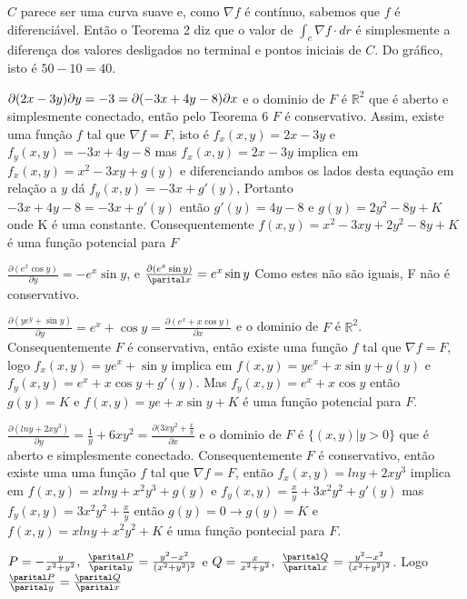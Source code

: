 \documentclass[11pt,a4paper]{article}
\begin{document}
\begin{enumerate}
{\item $C$ parece ser uma curva suave e, como $\nabla f$ é contínuo, sabemos que $f$ é diferenciável. Então o Teorema 2 diz que o valor
de $\int_c \nabla f · dr$ é simplesmente a diferença dos valores desligados no terminal e pontos iniciais de $ C$. Do gráfico, isto é
$50-10 = 40$.
\item $\partial(2x - 3y)\/ \partial y = -3 = \partial(-3x + 4y - 8)\/ \partial x$ e o dominio de $F$ é $\mathbb{R}^2$ que é aberto e simplesmente conectado, então pelo Teorema 6 $F$ é conservativo. Assim, existe uma função $f$ tal que $\nabla f =  F$, isto é $f_x (x,y) = 2x - 3y$ e $f_y (x,y) = -3x + 4y - 8$ mas $f_x (x,y) = 2x - 3y$ implica em $f_x (x,y) = x^2 - 3xy + g(y)$ e diferenciando ambos os lados desta equação em relação a $y$ dá $f_y (x,y) = -3x + g'(y)$, Portanto $- 3x + 4y - 8 = -3x + g'(y)$ então $g'(y)= 4y - 8$ e
$g(y) = 2y^2 - 8y + K $ onde K é uma constante. Consequentemente $f(x, y) = x^2 - 3xy + 2y^2- 8y +K$ é uma função potencial para $F$
\item $\frac{\partial(e^x \cos y)}{\partial y} = -e^x \sin y$, e $\frac{\partial(e^x \sin y)}{\parital x} = e^x\sin y $ Como estes não são iguais, F não é conservativo.
\item $\frac{\partial (ye^y + \sin y)}{\partial y} =  e^x + \cos y = \frac{\partial (e^x + x\cos y)}{\partial x}$ e o dominio de $F$ é $\mathbb{R}^2$. Consequentemente $F$ é conservativa, então existe uma função $f$ tal que $\nabla f = F$, logo $f_x (x,y) = ye^x + \sin y$ implica em $f(x,y) = ye^x + x\sin y + g(y)$ e $f_y (x,y) = e^x + x\cos y + g'(y)$. Mas $f_y (x,y) = e^x + x\cos y$ então $g(y) = K$ e $f(x,y) = ye + x\sin y + K$ é uma função potencial para $F$.
\item $\frac{\partial (ln y + 2xy^3) }{\partial y} = \frac{1}{y} + 6xy^2 = \frac{\partial (3xy^2 + \frac{x}{y}}{\partial x}$ e o dominio de $F$ é $\{(x,y) | y > 0 \}$ que é aberto e simplesmente
conectado. Consequentemente $F$ é conservativo, então existe uma uma função $f$ tal que $\nabla f = F$, então $f_x (x,y) = ln  y + 2xy^3$ implica em $f(x,y) = xln y + x^2 y^3 + g(y)$ e $f_y (x,y) = \frac{x}{y} + 3x^2 y^2 + g'(y)$ mas $f_y (x,y) =  3x^2 y^2 + \frac{x}{y} $ então $g(y) = 0 \rightarrow g(y) = K$ e $f(x,y) = x ln y + x^2 y^2 + K$ é uma função pontecial para $F$.
\item $P = -\frac{y}{x^2 + y^2},\ \frac{\parital P}{\parital y} = \frac{y^2 - x^2}{(x^2 + y^2)^2}$ e $Q  = \frac{x}{x^2 + y^2}, \ \frac{\parital Q}{\parital x} = \frac{y^2 - x^2}{(x^2 + y^2)^2}$. Logo $\frac{\parital P}{\parital y} = \frac{\parital Q}{\parital x}$
	
}
\end{enumerate}
\end{document}

